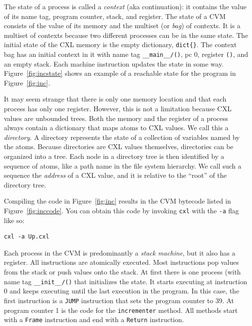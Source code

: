 \documentclass{report}
\newenvironment{code}{
\tcolorbox
}{
\endtcolorbox
}
\begin{document}
The state of a process is called a \emph{context} (aka continuation):
it contains the value of
its name tag, program counter, stack, and register.
The state of a CVM
consists of the value of its memory and the multiset (or \emph{bag})
of contexts.  It is a multiset of contexts because two different processes can
be in the same state.
The initial state of the CXL memory is the empty dictionary, \texttt{dict\{\}}.
The context bag has an initial context in it with name tag
\texttt{\_\_main\_\_/()}, pc 0, register \texttt{()}, and an empty stack.
Each machine instruction updates the state in some way.
Figure~\ref{fig:incstate} shows an example of a reachable state for 
the program in Figure~\ref{fig:inc}.


It may seem strange that there is only one memory location and that each
process has only one register.  However, this is not a limitation because
CXL values are unbounded trees.
Both the memory and the register of a process always contain
a dictionary that maps atoms to CXL values.  We call this a \emph{directory}.
A directory represents the state of a collection of variables named by the atoms.
%
Because directories are CXL values themselves,
directories can be organized into a tree.
Each node in a directory tree is then identified
by a sequence of atoms, like a path name in the file system hierarchy.  We call
such a sequence the \emph{address}
of a CXL value, and it is relative to the
``root'' of the directory tree.

Compiling the code in Figure~\ref{fig:inc} results in the CVM bytecode
listed in Figure~\ref{fig:inccode}.
You can obtain this code by invoking \texttt{cxl} with the \texttt{-a} flag
like so:
\begin{code}
\begin{verbatim}
cxl -a Up.cxl
\end{verbatim}
\end{code}
Each process in the CVM is predominantly a \emph{stack machine},
but it also has a register.
All instructions are atomically executed.
Most instructions pop values from the stack or push values onto the stack.
At first there is one process (with name tag \texttt{\_\_init\_\_/()}
that initializes the state.
It starts executing at instruction 0 and keeps executing until the last
execution in the program.
In this case, the first instruction is a \texttt{JUMP} instruction that sets the
program counter to 39.
At program counter 1 is the code for the \texttt{incrementer} method.
All methods start with a \texttt{Frame} instruction and end with a \texttt{Return}
instruction.
\end{document}
